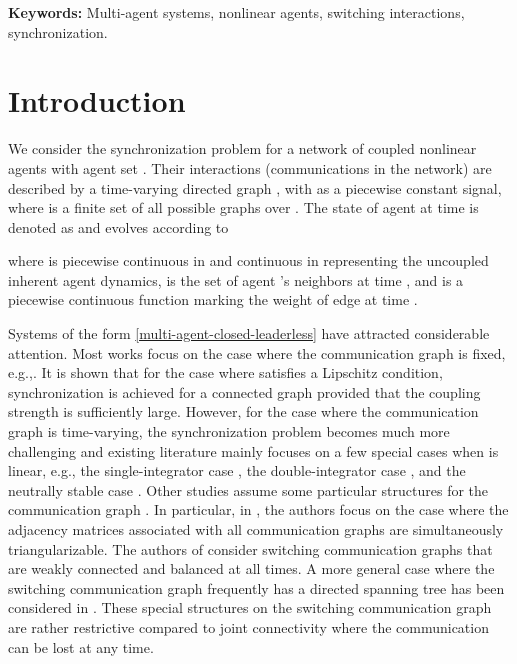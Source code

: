 \documentclass[a4paper, 11pt]{article}
\begin{document}
{\bf Keywords:} Multi-agent systems, nonlinear agents, switching interactions, synchronization.

\section{Introduction} \label{sec-intro}
We consider the synchronization problem for a network of coupled nonlinear agents
with agent set .
Their interactions (communications in the network) are described
by a time-varying directed graph ,
with  as a piecewise constant signal, where  is a finite set of all possible graphs over .
The state of agent  at time  is denoted as  and
evolves according to

where  is piecewise continuous in  and continuous in 
representing the uncoupled inherent agent dynamics,
 is the set of agent 's neighbors at time ,
and  is a piecewise continuous function marking the weight of edge  at time .

Systems of the form \eqref{multi-agent-closed-leaderless} have attracted considerable attention.
Most works focus on the case where the communication graph  is fixed, e.g.,\cite{wu-chua,wu-book,belykh-belykh-hasler,delellis-circuit,yu-chen-cao-tac2011,munz3,liu-cao-wu}. It is shown that
for the case where  satisfies a Lipschitz condition,
synchronization is achieved for a connected graph provided that the coupling strength is sufficiently large.
However, for the case where the communication graph is time-varying, the synchronization problem becomes much more challenging and existing literature mainly focuses on a few special cases when  is linear, e.g., the single-integrator case \cite{jadbabaie-lin-morse,moreau,lin07}, the double-integrator case \cite{ren-beard}, and the neutrally stable case \cite{scardovi-sepulchre,su-huang-tac}. Other studies assume some particular structures for the communication graph \cite{zhao-hill-liu,qin-gao-zheng,wen-duan-chen-yu}.
In particular, in \cite{zhao-hill-liu}, the authors focus on the case where the adjacency matrices associated with all communication graphs are simultaneously triangularizable. The authors of \cite{qin-gao-zheng} consider switching communication graphs that are weakly connected and balanced at all times. A more general case where the switching communication graph frequently has a directed spanning tree has been considered in \cite{wen-duan-chen-yu}. These special structures on the switching communication graph are rather restrictive compared to joint connectivity where the communication can be lost at any time.
\end{document}
